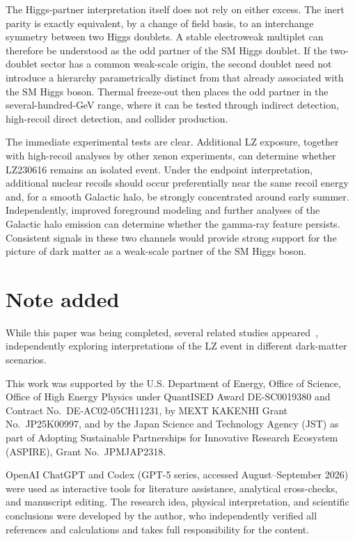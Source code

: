 \documentclass[aps,prd,twocolumn,nofootinbib,superscriptaddress]{revtex4-2}
\begin{document}
The Higgs-partner interpretation itself does not rely on either excess. The inert parity is exactly equivalent, by a change of field basis, to an interchange symmetry between two Higgs doublets. A stable electroweak multiplet can therefore be understood as the odd partner of the SM Higgs doublet. If the two-doublet sector has a common weak-scale origin, the second doublet need not introduce a hierarchy parametrically distinct from that already associated with the SM Higgs boson. Thermal freeze-out then places the odd partner in the several-hundred-GeV range, where it can be tested through indirect detection, high-recoil direct detection, and collider production.

The immediate experimental tests are clear. Additional LZ exposure, together with high-recoil analyses by other xenon experiments, can determine whether LZ230616 remains an isolated event. Under the endpoint interpretation, additional nuclear recoils should occur preferentially near the same recoil energy and, for a smooth Galactic halo, be strongly concentrated around early summer. Independently, improved foreground modeling and further analyses of the Galactic halo emission can determine whether the gamma-ray feature persists. Consistent signals in these two channels would provide strong support for the picture of dark matter as a weak-scale partner of the SM Higgs boson.


\section*{Note added}

While this paper was being completed, several related studies appeared~\cite{Su:2026rwz,Fan:2026kxx,Freese:2026sga,Wu:2026nhi,Lou:2026idn}, independently exploring interpretations of the LZ event in different dark-matter scenarios.


\begin{acknowledgments}
This work was supported by the U.S. Department of Energy, Office of Science, Office of High Energy Physics under QuantISED Award DE-SC0019380 and Contract No.\ DE-AC02-05CH11231, by MEXT KAKENHI Grant No.\ JP25K00997, and by the Japan Science and Technology Agency (JST) as part of Adopting Sustainable Partnerships for Innovative Research Ecosystem (ASPIRE), Grant No.\ JPMJAP2318.

OpenAI ChatGPT and Codex (GPT-5 series, accessed August--September 2026) were used as interactive tools for literature assistance, analytical cross-checks, and manuscript editing. The research idea, physical interpretation, and scientific conclusions were developed by the author, who independently verified all references and calculations and takes full responsibility for the content.
\end{acknowledgments}
\end{document}
